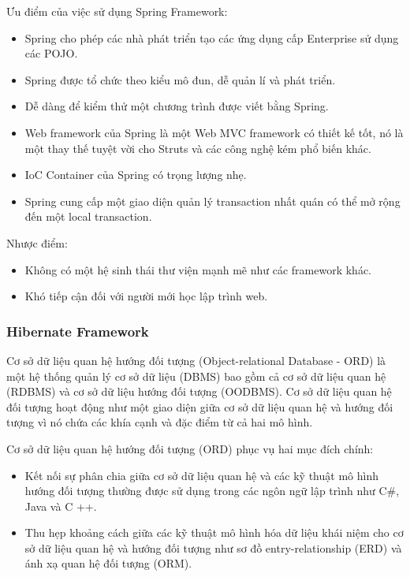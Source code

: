 Ưu điểm của việc sử dụng Spring Framework:
\begin{itemize}
    \item Spring cho phép các nhà phát triển tạo các ứng dụng cấp Enterprise sử dụng các POJO. 
    \item Spring được tổ chức theo kiểu mô đun, dễ quản lí và phát triển.
    \item Dễ dàng để kiểm thử một chương trình được viết bằng Spring.
    \item Web framework của Spring là một Web MVC framework có thiết kế tốt, nó là một thay thế tuyệt vời cho Struts và các công nghệ kém phổ biến khác.
    \item IoC Container của Spring có trọng lượng nhẹ.
    \item Spring cung cấp một giao diện quản lý transaction nhất quán có thể mở rộng đến một local transaction.
\end{itemize}
Nhược điểm:
\begin{itemize}
    \item Không có một hệ sinh thái thư viện mạnh mẽ như các framework khác.
    \item Khó tiếp cận đối với người mới học lập trình web.
\end{itemize}

\subsubsection{Hibernate Framework}
Cơ sở dữ liệu quan hệ hướng đối tượng (Object-relational Database - ORD) là một hệ thống quản lý cơ sở dữ liệu (DBMS) bao gồm cả cơ sở dữ liệu quan hệ (RDBMS) và cơ sở dữ liệu hướng đối tượng (OODBMS). Cơ sở dữ liệu quan hệ đối tượng hoạt động như một giao diện giữa cơ sở dữ liệu quan hệ và hướng đối tượng vì nó chứa các khía cạnh và đặc điểm từ cả hai mô hình.\par

Cơ sở dữ liệu quan hệ hướng đối tượng (ORD) phục vụ hai mục đích chính:
\begin{itemize}
    \item Kết nối sự phân chia giữa cơ sở dữ liệu quan hệ và các kỹ thuật mô hình hướng đối tượng thường được sử dụng trong các ngôn ngữ lập trình như C\#, Java và C ++.
    \item Thu hẹp khoảng cách giữa các kỹ thuật mô hình hóa dữ liệu khái niệm cho cơ sở dữ liệu quan hệ và hướng đối tượng như sơ đồ entry-relationship (ERD) và ánh xạ quan hệ đối tượng (ORM).
\end{itemize}

